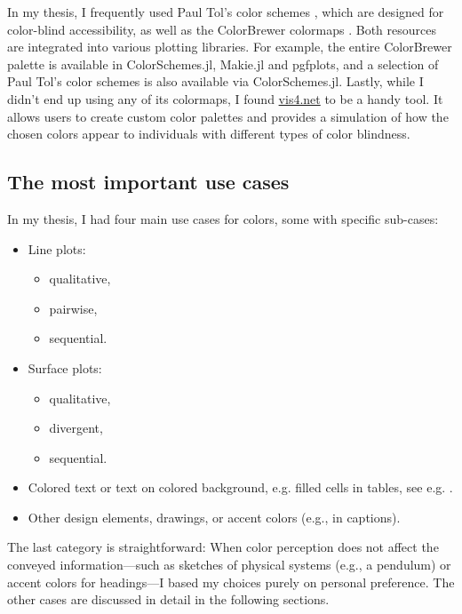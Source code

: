 In my thesis, I frequently used Paul Tol’s color schemes \cite{paultol}, which are designed for color-blind accessibility, as well as the ColorBrewer colormaps \cite{colorbrewer}. Both resources are integrated into various plotting libraries. For example, the entire ColorBrewer palette is available in ColorSchemes.jl, Makie.jl and pgfplots, and a selection of Paul Tol's color schemes is also available via ColorSchemes.jl.
Lastly, while I didn’t end up using any of its colormaps, I found \href{https://www.vis4.net/palettes/}{vis4.net} \cite{chromajs} to be a handy tool. It allows users to create custom color palettes and provides a simulation of how the chosen colors appear to individuals with different types of color blindness.

\subsection{The most important use cases}
In my thesis, I had four main use cases for colors, some with specific sub-cases:
\begin{itemize}[itemsep = 1pt]
	\item Line plots:
		\begin{itemize}[noitemsep]
			\item qualitative,
			\item pairwise,
			\item sequential. 
		\end{itemize}
	\item Surface plots:
		\begin{itemize}[noitemsep]
			\item qualitative,
			\item divergent,
			\item sequential. 
		\end{itemize}
	\item Colored text or text on colored background, e.g. filled cells in tables, see e.g. .
	\item Other design elements, drawings, or accent colors (e.g., in captions).
\end{itemize}
The last category is straightforward: When color perception does not affect the conveyed information---such as sketches of physical systems (e.g., a pendulum) or accent colors for headings---I based my choices purely on personal preference. The other cases are discussed in detail in the following sections.

